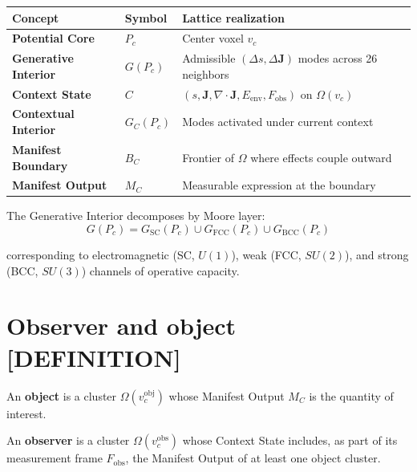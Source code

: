 \documentclass[
  11pt,
  letterpaper,
  twoside,
  openany]{book}
\makeatletter
\let\orig@section\section
\renewcommand{\section}{\needspace{8\baselineskip}\orig@section}
\makeatother
\begin{document}
\begin{longtable}[]{@{}
  >{\raggedright\arraybackslash}p{}
  >{\raggedright\arraybackslash}p{}
  >{\raggedright\arraybackslash}p{}@{}}
\toprule\noalign{}
\begin{minipage}[b]{\linewidth}\raggedright
Concept
\end{minipage} & \begin{minipage}[b]{\linewidth}\raggedright
Symbol
\end{minipage} & \begin{minipage}[b]{\linewidth}\raggedright
Lattice realization
\end{minipage} \\
\midrule\noalign{}
\endhead
\bottomrule\noalign{}
\endlastfoot
\textbf{Potential Core} & \(P_c\) & Center voxel \(v_c\) \\
\textbf{Generative Interior} & \(G(P_c)\) & Admissible
\((\Delta s, \Delta \mathbf{J})\) modes across 26 neighbors \\
\textbf{Context State} & \(C\) &
\((s, \mathbf{J}, \nabla \cdot \mathbf{J}, E_{\text{env}}, F_{\text{obs}})\)
on \(\Omega(v_c)\) \\
\textbf{Contextual Interior} & \(G_C(P_c)\) & Modes activated under
current context \\
\textbf{Manifest Boundary} & \(B_C\) & Frontier of \(\Omega\) where
effects couple outward \\
\textbf{Manifest Output} & \(M_C\) & Measurable expression at the
boundary \\
\end{longtable}

The Generative Interior decomposes by Moore layer: \[
G(P_c) = G_{\text{SC}}(P_c) \cup G_{\text{FCC}}(P_c) \cup G_{\text{BCC}}(P_c)
\]

corresponding to electromagnetic (SC, \(U(1)\)), weak (FCC, \(SU(2)\)),
and strong (BCC, \(SU(3)\)) channels of operative capacity.

\section{Observer and object
{[}DEFINITION{]}}\label{observer-and-object-definition}

\begin{ftddefinition}

An \textbf{object} is a cluster \(\Omega(v_c^{\text{obj}})\) whose
Manifest Output \(M_C\) is the quantity of interest.

An \textbf{observer} is a cluster \(\Omega(v_c^{\text{obs}})\) whose
Context State includes, as part of its measurement frame
\(F_{\text{obs}}\), the Manifest Output of at least one object cluster.

\end{ftddefinition}
\end{document}
